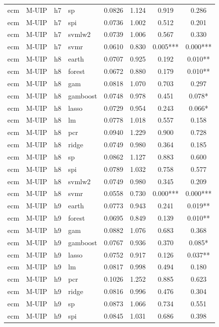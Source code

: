 \begin{ThreePartTable}
\begin{longtable}[t]{llclcccc}
ecm & M-UIP & h7 & sp & 0.0826 & 1.124 & 0.919 & 0.286\\
ecm & M-UIP & h7 & spi & 0.0736 & 1.002 & 0.512 & 0.201\\
ecm & M-UIP & h7 & svmlw2 & 0.0739 & 1.006 & 0.567 & 0.330\\
ecm & M-UIP & h7 & svmr & 0.0610 & 0.830 & 0.005*** & 0.000***\\
\addlinespace
ecm & M-UIP & h8 & earth & 0.0707 & 0.925 & 0.192 & 0.010**\\
ecm & M-UIP & h8 & forest & 0.0672 & 0.880 & 0.179 & 0.010**\\
ecm & M-UIP & h8 & gam & 0.0818 & 1.070 & 0.703 & 0.297\\
ecm & M-UIP & h8 & gamboost & 0.0748 & 0.978 & 0.451 & 0.078*\\
ecm & M-UIP & h8 & lasso & 0.0729 & 0.954 & 0.243 & 0.066*\\
ecm & M-UIP & h8 & lm & 0.0778 & 1.018 & 0.557 & 0.158\\
ecm & M-UIP & h8 & pcr & 0.0940 & 1.229 & 0.900 & 0.728\\
ecm & M-UIP & h8 & ridge & 0.0749 & 0.980 & 0.364 & 0.185\\
ecm & M-UIP & h8 & sp & 0.0862 & 1.127 & 0.883 & 0.600\\
ecm & M-UIP & h8 & spi & 0.0789 & 1.032 & 0.758 & 0.577\\
ecm & M-UIP & h8 & svmlw2 & 0.0749 & 0.980 & 0.345 & 0.209\\
ecm & M-UIP & h8 & svmr & 0.0558 & 0.730 & 0.000*** & 0.000***\\
\addlinespace
ecm & M-UIP & h9 & earth & 0.0773 & 0.943 & 0.241 & 0.019**\\
ecm & M-UIP & h9 & forest & 0.0695 & 0.849 & 0.139 & 0.010**\\
ecm & M-UIP & h9 & gam & 0.0882 & 1.076 & 0.683 & 0.368\\
ecm & M-UIP & h9 & gamboost & 0.0767 & 0.936 & 0.370 & 0.085*\\
ecm & M-UIP & h9 & lasso & 0.0752 & 0.917 & 0.126 & 0.037**\\
ecm & M-UIP & h9 & lm & 0.0817 & 0.998 & 0.494 & 0.180\\
ecm & M-UIP & h9 & pcr & 0.1026 & 1.252 & 0.885 & 0.623\\
ecm & M-UIP & h9 & ridge & 0.0816 & 0.996 & 0.476 & 0.304\\
ecm & M-UIP & h9 & sp & 0.0873 & 1.066 & 0.734 & 0.551\\
ecm & M-UIP & h9 & spi & 0.0845 & 1.031 & 0.686 & 0.398\\

\end{longtable}
\end{ThreePartTable}
